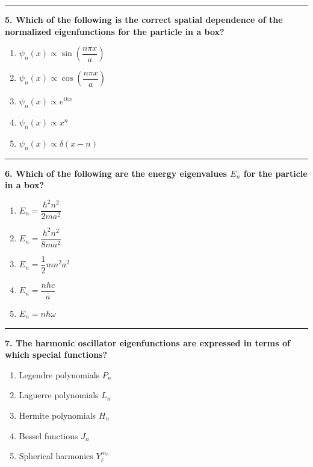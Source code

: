 \documentclass[
  english,
  9pt,
]{extbook}
\providecommand{\tightlist}{%
  \setlength{\itemsep}{0pt}\setlength{\parskip}{0pt}}
\theoremstyle{definition}
\theoremstyle{definition}
\theoremstyle{definition}
\theoremstyle{definition}
\theoremstyle{remark}
\begin{document}
\begin{center}\rule{0.5\linewidth}{0.5pt}\end{center}

\textbf{5. Which of the following is the correct spatial dependence of the normalized eigenfunctions for the particle in a box?}

\begin{enumerate}
\def\labelenumi{\alph{enumi}.}
\tightlist
\item
  \(\psi_n(x) \propto \sin\left(\dfrac{n\pi x}{a}\right)\)\\
\item
  \(\psi_n(x) \propto \cos\left(\dfrac{n\pi x}{a}\right)\)\\
\item
  \(\psi_n(x) \propto e^{ikx}\)\\
\item
  \(\psi_n(x) \propto x^n\)\\
\item
  \(\psi_n(x) \propto \delta(x-n)\)
\end{enumerate}

\begin{center}\rule{0.5\linewidth}{0.5pt}\end{center}

\textbf{6. Which of the following are the energy eigenvalues \(E_n\) for the particle in a box?}

\begin{enumerate}
\def\labelenumi{\alph{enumi}.}
\tightlist
\item
  \(E_n = \dfrac{\hbar^2 n^2}{2 m a^2}\)
\item
  \(E_n = \dfrac{h^2 n^2}{8 m a^2}\)\\
\item
  \(E_n = \dfrac{1}{2} m n^2 a^2\)\\
\item
  \(E_n = \dfrac{n h c}{a}\)\\
\item
  \(E_n = n \hbar \omega\)
\end{enumerate}

\begin{center}\rule{0.5\linewidth}{0.5pt}\end{center}

\textbf{7. The harmonic oscillator eigenfunctions are expressed in terms of which special functions?}

\begin{enumerate}
\def\labelenumi{\alph{enumi}.}
\tightlist
\item
  Legendre polynomials \(P_n\)\\
\item
  Laguerre polynomials \(L_n\)\\
\item
  Hermite polynomials \(H_n\)\\
\item
  Bessel functions \(J_n\)\\
\item
  Spherical harmonics \(Y_{\ell}^{m_\ell}\)
\end{enumerate}
\end{document}

